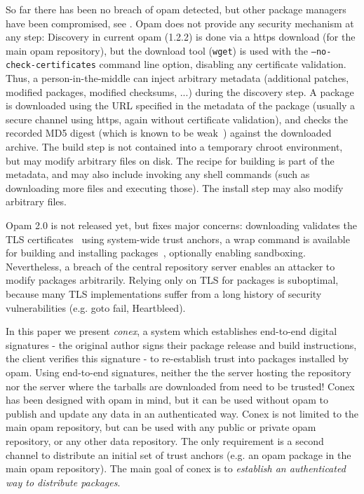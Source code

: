 \documentclass[nocopyrightspace]{sigplanconf}
\begin{document}
So far there has been no breach of opam detected, but other package managers have been compromised, see \cite{cabal,maven,npm,rubygems}.
Opam does not provide any security mechanism at any step:
Discovery in current opam (1.2.2) is done via a https download (for the main opam repository), but the download tool (\texttt{wget}) is used with the \texttt{--no-check-certificates} command line option, disabling any certificate validation.
Thus, a person-in-the-middle can inject arbitrary metadata (additional patches, modified packages, modified checksums, ...) during the discovery step.
A package is downloaded using the URL specified in the metadata of the package (usually a secure channel using https, again without certificate validation), and checks the recorded MD5 digest (which is known to be weak~\cite{rfc6151}) against the downloaded archive.
The build step is not contained into a temporary chroot environment, but may modify arbitrary files on disk.
The recipe for building is part of the metadata, and may also include invoking any shell commands (such as downloading more files and executing those).
The install step may also modify arbitrary files.

Opam 2.0 is not released yet, but fixes major concerns:
downloading validates the TLS certificates~\cite{opampr} using system-wide trust anchors,
a wrap command is available for building and installing packages~\cite{wrappr}, optionally enabling sandboxing.
Nevertheless, a breach of the central repository server enables an attacker to modify packages arbitrarily.
Relying only on TLS for packages is suboptimal, because many TLS implementations suffer from a long history of security vulnerabilities (e.g. goto fail, Heartbleed).

In this paper we present \emph{conex}, a system which establishes end-to-end digital signatures - the original author signs their package release and build instructions, the client verifies this signature - to re-establish trust into packages installed by opam.
Using end-to-end signatures, neither the the server hosting the repository nor the server where the tarballs are downloaded from need to be trusted!
Conex has been designed with opam in mind, but it can be used without opam to publish and update any data in an authenticated way.
Conex is not limited to the main opam repository, but can be used with any public or private opam repository, or any other data repository.
The only requirement is a second channel to distribute an initial set of trust anchors (e.g. an opam package in the main opam repository).
The main goal of conex is to \emph{establish an authenticated way to distribute packages}.
\end{document}

